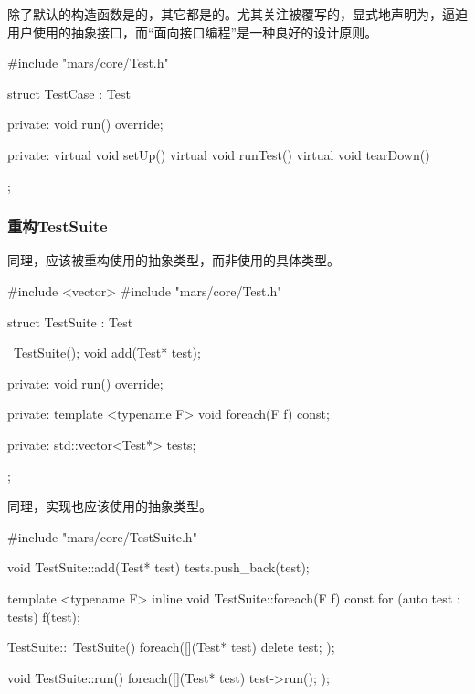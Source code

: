 \begin{content}
除了默认的构造函数是的，其它都是的。尤其关注被覆写的，显式地声明为，逼迫用户使用的抽象接口，而“面向接口编程”是一种良好的设计原则。

\begin{leftbar}
 \begin{c++}[caption={\ttfamily{include/mars/core/TestCase.h}}]
#include "mars/core/Test.h"

struct TestCase : Test {
private:
  void run() override;

private:
  virtual void setUp() {}
  virtual void runTest() {}
  virtual void tearDown() {}
};
 \end{c++}
\end{leftbar}

\subsubsection{重构TestSuite}

同理，应该被重构使用的抽象类型，而非使用的具体类型。

\begin{leftbar}
 \begin{c++}[caption={\ttfamily{include/mars/core/TestSuite.h}}]
#include <vector>
#include "mars/core/Test.h"

struct TestSuite : Test {
  ~TestSuite();
  void add(Test* test);

private:
  void run() override;

private:
  template <typename F>
  void foreach(F f) const;

private:
  std::vector<Test*> tests;
};
 \end{c++}
\end{leftbar}

同理，实现也应该使用的抽象类型。

\begin{leftbar}
 \begin{c++}[caption={\ttfamily{src/mars/core/TestSuite.cc}}]
#include "mars/core/TestSuite.h"

void TestSuite::add(Test* test) {
  tests.push_back(test);
}

template <typename F>
inline void TestSuite::foreach(F f) const {
  for (auto test : tests) {
    f(test);
  }
}

TestSuite::~TestSuite() {
  foreach([](Test* test) {
    delete test;
  });
}

void TestSuite::run() {
  foreach([](Test* test) {
    test->run();
  });
}
 \end{c++}
\end{leftbar}

\end{content}

